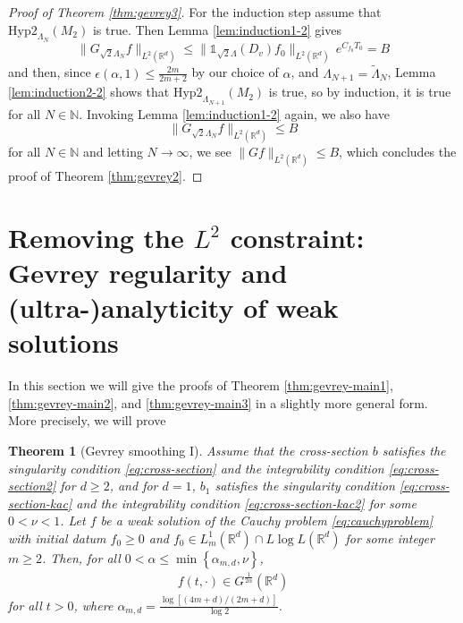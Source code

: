 \documentclass[11pt,a4paper,reqno]{amsart}
\theoremstyle{plain}
\newtheorem{theorem}[proposition]{Theorem}
\theoremstyle{definition}
\begin{document}
\begin{proof}[Proof of Theorem \ref{thm:gevrey3}]
  For the induction step assume that $\mathrm{Hyp2}_{\Lambda_N}(M_2)$ is true. Then Lemma \ref{lem:induction1-2} gives
  \begin{equation*}
  	\| G_{\sqrt{2}\Lambda_N} f\|_{L^2({\mathbb{R}}^d)} \le \|{\mathds{1}}_{\sqrt{2}\Lambda}(D_v) f_0\|_{L^2({\mathbb{R}}^d)} \, e^{C_{f_0}T_0} = B
  \end{equation*}
  and then, since $\epsilon(\alpha,1)\le \frac{2m}{2m+2}$ by our choice of $\alpha$, and
  $\Lambda_{N+1}= \widetilde{\Lambda}_N$, Lemma \ref{lem:induction2-2} shows that  $\mathrm{Hyp2}_{\Lambda_{N+1}}(M_2)$ is true, so by induction, it is true for all $N\in{\mathbb{N}}$.
  Invoking Lemma \ref{lem:induction1-2} again, we also have
  \begin{equation*}
  	\|G_{\sqrt{2}\Lambda_N}f\|_{L^2({\mathbb{R}}^d)} \leq B
  \end{equation*}
  for all $N\in{\mathbb{N}}$ and letting $N\to\infty$, we see
  $\|Gf\|_{L^2({\mathbb{R}}^d)} \leq B $, which concludes the proof of Theorem \ref{thm:gevrey2}.
\end{proof}

\section[Gevrey regularity and (ultra-)analyticity of weak solutions]{Removing the $L^2$ constraint: Gevrey regularity and (ultra-)analyticity of weak solutions}\label{sec:great-results}
In this section we will give the proofs of Theorem \ref{thm:gevrey-main1}, \ref{thm:gevrey-main2}, and \ref{thm:gevrey-main3} in a slightly more general form. More precisely, we will prove

\begin{theorem}[Gevrey smoothing I]\label{thm:gevrey-main1-m}
		Assume that the cross-section $b$ satisfies the \emph{singularity condition} \eqref{eq:cross-section} and the \emph{integrability condition} \eqref{eq:cross-section2} for $d\geq 2$, and for $d=1$, $b_1$ satisfies the \emph{singularity condition} \eqref{eq:cross-section-kac} and the \emph{integrability condition} \eqref{eq:cross-section-kac2} for some $0<\nu<1$. Let $f$ be a weak solution of the Cauchy problem \eqref{eq:cauchyproblem} with initial datum $f_0\ge 0$ and $f_0\in L^1_m({\mathbb{R}}^d)\cap L\log L({\mathbb{R}}^d)$ for some integer $m\ge 2$. Then, for all $0<\alpha\leq \min\left\{\alpha_{m,d}, \nu\right\}$,
	\begin{align}
		f(t,\cdot)\in G^{\tfrac{1}{2\alpha}}({\mathbb{R}}^d)
	\end{align}
	for all $t>0$, where $\alpha_{m,d} = \frac{\log[(4m+d)/(2m+d)]}{\log 2}$.
\end{theorem}
\end{document}
